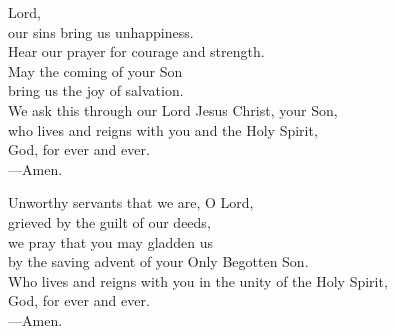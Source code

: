 \prayer


\begin{prayerverse}
Lord,\\
our sins bring us unhappiness.\\
Hear our prayer for courage and strength.\\
May the coming of your Son\\
bring us the joy of salvation.\\
We ask this through our Lord Jesus Christ, your Son,\\
who lives and reigns with you and the Holy Spirit,\\
God, for ever and ever.\\
{\color{red}---\thinspace}Amen.
\end{prayerverse}


\begin{prayerverse}
Unworthy servants that we are, O Lord,\\
grieved by the guilt of our deeds,\\
we pray that you may gladden us\\
by the saving advent of your Only Begotten Son.\\
Who lives and reigns with you in the unity of the Holy Spirit,\\
God, for ever and ever.\\
{\color{red}---\thinspace}Amen.
\end{prayerverse}

